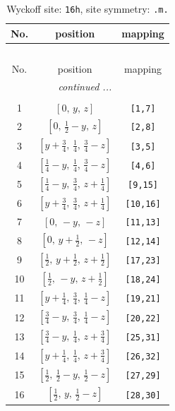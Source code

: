 \documentclass[fleqn,8pt]{jsarticle}
\begin{document}
\renewcommand{\arraystretch}{1.2}
\begin{longtable}{ccc}
\caption{Wyckoff site: {\tt 16h}, site symmetry: {\tt .m.}}
 \\
 \hline \hline
No. & position & mapping \\ \hline \endfirsthead

\multicolumn{2}{l}{\tablename\ \thetable{}} \\
 \hline \hline
No. & position & mapping \\ \hline \endhead

 \hline \hline
\multicolumn{2}{r}{\footnotesize\it continued ...} \\ \endfoot

 \hline \hline
\multicolumn{2}{r}{} \\ \endlastfoot

1 & $\left[ 0,\, y,\, z \right]$ & {\tt [1,7]} \\ \hline
2 & $\left[ 0,\, \frac{1}{2} - y,\, z \right]$ & {\tt [2,8]} \\ \hline
3 & $\left[ y + \frac{3}{4},\, \frac{1}{4},\, \frac{3}{4} - z \right]$ & {\tt [3,5]} \\ \hline
4 & $\left[ \frac{1}{4} - y,\, \frac{1}{4},\, \frac{3}{4} - z \right]$ & {\tt [4,6]} \\ \hline
5 & $\left[ \frac{1}{4} - y,\, \frac{3}{4},\, z + \frac{1}{4} \right]$ & {\tt [9,15]} \\ \hline
6 & $\left[ y + \frac{3}{4},\, \frac{3}{4},\, z + \frac{1}{4} \right]$ & {\tt [10,16]} \\ \hline
7 & $\left[ 0,\, - y,\, - z \right]$ & {\tt [11,13]} \\ \hline
8 & $\left[ 0,\, y + \frac{1}{2},\, - z \right]$ & {\tt [12,14]} \\ \hline
9 & $\left[ \frac{1}{2},\, y + \frac{1}{2},\, z + \frac{1}{2} \right]$ & {\tt [17,23]} \\ \hline
10 & $\left[ \frac{1}{2},\, - y,\, z + \frac{1}{2} \right]$ & {\tt [18,24]} \\ \hline
11 & $\left[ y + \frac{1}{4},\, \frac{3}{4},\, \frac{1}{4} - z \right]$ & {\tt [19,21]} \\ \hline
12 & $\left[ \frac{3}{4} - y,\, \frac{3}{4},\, \frac{1}{4} - z \right]$ & {\tt [20,22]} \\ \hline
13 & $\left[ \frac{3}{4} - y,\, \frac{1}{4},\, z + \frac{3}{4} \right]$ & {\tt [25,31]} \\ \hline
14 & $\left[ y + \frac{1}{4},\, \frac{1}{4},\, z + \frac{3}{4} \right]$ & {\tt [26,32]} \\ \hline
15 & $\left[ \frac{1}{2},\, \frac{1}{2} - y,\, \frac{1}{2} - z \right]$ & {\tt [27,29]} \\ \hline
16 & $\left[ \frac{1}{2},\, y,\, \frac{1}{2} - z \right]$ & {\tt [28,30]} \\
\end{longtable}
\end{document}
